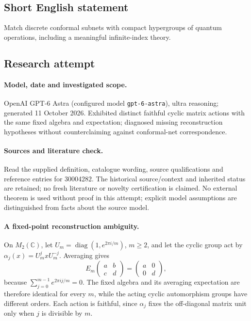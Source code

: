 \documentclass[11pt]{article}
\begin{document}
\subsection{Short English statement}
Match discrete conformal subnets with compact hypergroups of quantum operations, including a meaningful infinite-index theory.
\subsection{Research attempt}
\paragraph{Model, date and investigated scope.}
OpenAI GPT-6 Astra (configured model \texttt{gpt-6-astra}), ultra reasoning; generated 11 October 2026. Exhibited distinct faithful cyclic matrix actions with the same fixed algebra and expectation; diagnosed missing reconstruction hypotheses without counterclaiming against conformal-net correspondence.

\paragraph{Sources and literature check.}
Read the supplied definition, catalogue wording, source qualifications and reference entries for 30004282. The historical source/context and inherited status are retained; no fresh literature or novelty certification is claimed. No external theorem is used without proof in this attempt; explicit model assumptions are distinguished from facts about the source model.

\paragraph{A fixed-point reconstruction ambiguity.} On \(M_2(\mathbb C)\), let \(U_m=\operatorname{diag}(1,e^{2\pi i/m})\), \(m\ge2\), and let the cyclic group act by \(\alpha_j(x)=U_m^jxU_m^{-j}\). Averaging gives
\[
 E_m\begin{pmatrix}a&b\\c&d\end{pmatrix}
 =\begin{pmatrix}a&0\\0&d\end{pmatrix},
\]
because \(\sum_{j=0}^{m-1}e^{2\pi ij/m}=0\). The fixed algebra and its averaging expectation are therefore identical for every \(m\), while the acting cyclic automorphism groups have different orders. Each action is faithful, since \(\alpha_j\) fixes the off-diagonal matrix unit only when \(j\) is divisible by \(m\).
\end{document}
